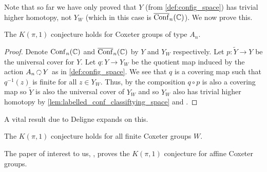 \documentclass[class=article, crop=false]{standalone}
\begin{document}
Note that so far we have only proved that $Y$ (from \cref{def:config_space}) has trivial higher homotopy, not $Y_W$ (which in this case is $\operatorname{\overline{Conf}}_n(\mathbb{C})$). We now prove this.

\begin{theorem}
	The $K(\pi,1)$ conjecture holds for Coxeter groups of type $A_n$.
\end{theorem}
\begin{proof}
	Denote $\operatorname{Conf}_n(\mathbb{C})$ and $\operatorname{\overline{Conf}}_n(\mathbb{C})$ by $Y$ and $Y_W$ respectively. Let $p \colon \widetilde{Y} \to Y$ be the universal cover for $Y$. Let $q \colon Y \to Y_W$ be the quotient map induced by the action $A_n \acts Y$ as in \cref{def:config_space}. We see that $q$ is a covering map such that $q^{-1}(z)$ is finite for all $z \in Y_W$. Thus, by \cite[Exercise 53.4]{munkres_topology_2000}
	the composition $q \circ p$ is also a covering map so $\widetilde{Y}$ is also the universal cover of $Y_W$ and so $Y_W$ also has trivial higher homotopy by \cref{lem:labelled_conf_classiftying_space} and \cite[Proposition 4.1]{hatcher_algebraic_2001}.
\end{proof}
A vital result due to Deligne expands on this.
\begin{theorem}
	The $K(\pi,1)$ conjecture holds for all finite Coxeter groups $W$.
	\label{thm:k_pi_1_finite}
\end{theorem}

The paper of interest to us, \cite{paolini_salvetti_kpi1_2021}, proves the $K(\pi,1)$ conjecture for affine Coxeter groups. 
\end{document}
